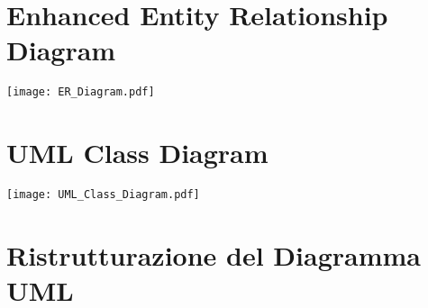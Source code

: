 \section{Enhanced Entity Relationship Diagram}
\begin{center}
  \texttt{[image: ER\_Diagram.pdf]}
\end{center}

\section{UML Class Diagram}
\begin{center}
  \texttt{[image: UML\_Class\_Diagram.pdf]}
\end{center}

\section{Ristrutturazione del Diagramma UML}


